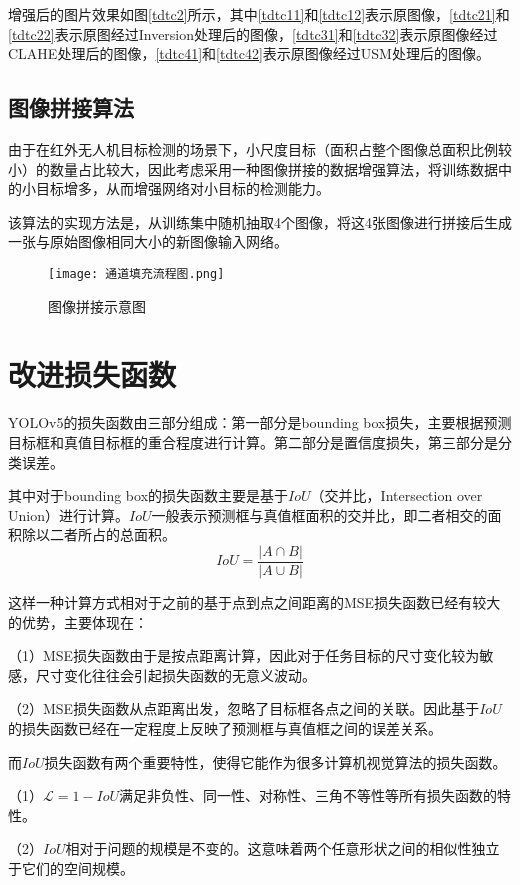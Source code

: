 增强后的图片效果如图\ref{tdtc2}所示，其中\ref{tdtc11}和\ref{tdtc12}表示原图像，\ref{tdtc21}和\ref{tdtc22}表示原图经过Inversion处理后的图像，\ref{tdtc31}和\ref{tdtc32}表示原图像经过CLAHE处理后的图像，\ref{tdtc41}和\ref{tdtc42}表示原图像经过USM处理后的图像。

\subsection{图像拼接算法}
由于在红外无人机目标检测的场景下，小尺度目标（面积占整个图像总面积比例较小）的数量占比较大，因此考虑采用一种图像拼接的数据增强算法，将训练数据中的小目标增多，从而增强网络对小目标的检测能力。

该算法的实现方法是，从训练集中随机抽取4个图像，将这4张图像进行拼接后生成一张与原始图像相同大小的新图像输入网络。

\begin{figure}[h]
  \centering
  \texttt{[image: 通道填充流程图.png]}
  \caption{图像拼接示意图}
  \label{txpj}
\end{figure}

\section{改进损失函数}
YOLOv5的损失函数由三部分组成：第一部分是bounding box损失，主要根据预测目标框和真值目标框的重合程度进行计算。第二部分是置信度损失，第三部分是分类误差。

其中对于bounding box的损失函数主要是基于$IoU$（交并比，Intersection over Union）进行计算。$IoU$一般表示预测框与真值框面积的交并比，即二者相交的面积除以二者所占的总面积。
\begin{equation}
  I o U=\frac{|A \cap B|}{|A \cup B|}
\end{equation}

这样一种计算方式相对于之前的基于点到点之间距离的MSE损失函数已经有较大的优势，主要体现在：

（1）MSE损失函数由于是按点距离计算，因此对于任务目标的尺寸变化较为敏感，尺寸变化往往会引起损失函数的无意义波动。

（2）MSE损失函数从点距离出发，忽略了目标框各点之间的关联。因此基于$IoU$的损失函数已经在一定程度上反映了预测框与真值框之间的误差关系。

而$IoU$损失函数有两个重要特性，使得它能作为很多计算机视觉算法的损失函数。

（1）$\mathcal{L}=1-IoU$满足非负性、同一性、对称性、三角不等性等所有损失函数的特性。

（2）$IoU$相对于问题的规模是不变的。这意味着两个任意形状之间的相似性独立于它们的空间规模。

